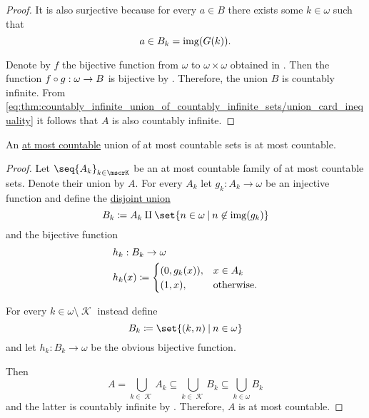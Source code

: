 \begin{proof}
  It is also surjective because for every \( a \in B \) there exists some \( k \in \omega \) such that
  \begin{equation*}
    a \in B_k = \operatorname{img}(G(k)).
  \end{equation*}

  Denote by \( f \) the bijective function from \( \omega \) to \( \omega \times \omega \) obtained in . Then the function \( f \bincirc g: \omega \to B \) is bijective by . Therefore, the union \( B \) is countably infinite. From \eqref{eq:thm:countably_infinite_union_of_countably_infinite_sets/union_card_inequality} it follows that \( A \) is also countably infinite.
\end{proof}

\begin{corollary}\label{thm:at_most_countable_union_of_at_most_countable_sets}
  An \hyperref[def:set_countability/at_most_countable]{at most countable} union of at most countable sets is at most countable.
\end{corollary}
\begin{proof}
  Let \( \seq{ A_k }_{k \in \mscrK} \) be an at most countable family of at most countable sets. Denote their union by \( A \). For every \( A_k \) let \( g_k: A_k \to \omega \) be an injective function and define the \hyperref[def:disjoint_union]{disjoint union}
  \begin{equation*}
    B_k \coloneqq A_k \amalg \set{ n \in \omega \given n \not\in \img(g_k) }
  \end{equation*}
  and the bijective function
  \begin{equation*}
    \begin{aligned}
      &h_k: B_k \to \omega \\
      &h_k(x) \coloneqq \begin{cases}
        (0, g_k(x)), &x \in A_k \\
        (1, x),      &\T{otherwise.}
      \end{cases}
    \end{aligned}
  \end{equation*}

  For every \( k \in \omega \setminus \mscrK \) instead define
  \begin{equation*}
    B_k \coloneqq \set{ (k, n) \given n \in \omega }
  \end{equation*}
  and let \( h_k: B_k \to \omega \) be the obvious bijective function.

  Then
  \begin{equation*}
    A
    =
    \bigcup_{k \in \mscrK} A_k
    \subseteq
    \bigcup_{k \in \mscrK} B_k
    \subseteq
    \bigcup_{k \in \omega} B_k
  \end{equation*}
  and the latter is countably infinite by . Therefore, \( A \) is at most countable.
\end{proof}
